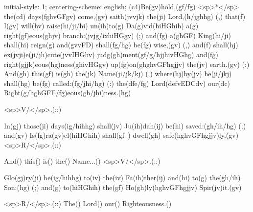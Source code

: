 initial-style: 1;
centering-scheme: english;
(c4)Be(gv)hold,(gf/fg) <sp>*</sp> the(cd) days(fghvGFgv) come,(gv) saith(jvvjk) the(ji) Lord,(h/jghhg) (,) that(f) I(gv) will(hv) raise(hi/ji/hi) un(ih)to(g) Da(g)vid(hiHGhih) a(g) right(gf)eous(ghjv) branch:(jvjg/ixhiHGgv) (;) and(fg) a(ghGF) King(hi/ji) shall(hi) reign(g) and(gvvFD) shall(fg/hg) be(fg) wise,(gv) (,) and(f) shall(hj) ex(jvji)e(ji/jh)cute(jvvIHGhv) judg(gh)ment(gf/g/hjjhivHGhg) and(fg) right(gjjk)eous(hg)ness(ghivHGgv) up(fg)on(ghghvGFhgjjv) the(jv) earth.(gv) (:) And(gh) this(gf) is(gh) the(jk) Name(ji/jk/kj) (,) where(hj)by(jv) he(ji/jkj) shall(hg) be(fg) called:(fg/jhi/hg) (:) the(dfe/fg) Lord(defvEDCdv) our(dc) Right(g/hghGFE/fg)eous(gh/jhi)ness.(hg) 

<sp>V/</sp>.(::)

In(gj) those(ji) days(ig/hihhg) shall(jv) Ju(ih)dah(ij) be(hi) saved:(gh/ih/hg) (;) and(gv) Is(fg)ra(gv)el(hiHGhih) shall(gf~) dwell(gh) safe(hghvGFhgjjv)ly.(gv) <sp>R/</sp>.(::)

And() this() is() the() Name...() <sp>V/</sp>.(::)

 Glo(gj)ry(ji) be(ig/hihhg) to(iv) the(iv) Fa(ih)ther(ij) and(hi) to(g) the(gh/ih) Son:(hg) (;) and(g) to(hiHGhih) the(gf) Ho(gh)ly(hghvGFhgjjv) Spir(jv)it.(gv)

<sp>R/</sp>.(::) The() Lord() our() Righteousness.()